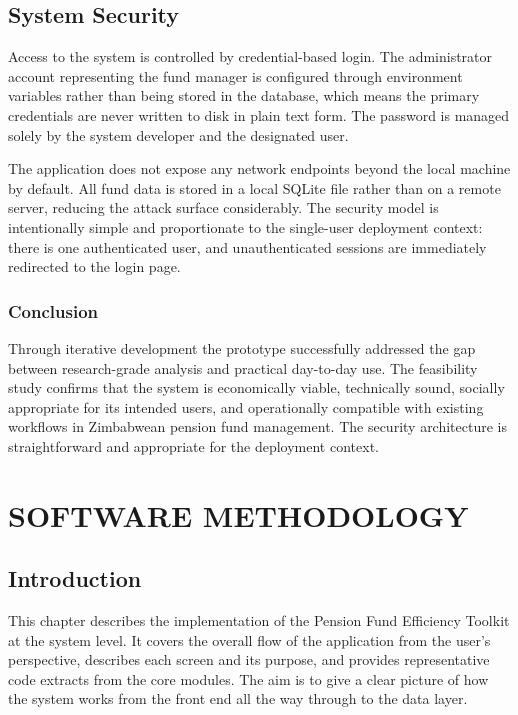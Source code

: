 \documentclass[12pt,a4paper]{report}
\begin{document}
\section{System Security}

Access to the system is controlled by credential-based login. The administrator account
representing the fund manager is configured through environment variables rather than
being stored in the database, which means the primary credentials are never written to disk
in plain text form. The password is managed solely by the system developer and the
designated user.

The application does not expose any network endpoints beyond the local machine by default.
All fund data is stored in a local SQLite file rather than on a remote server, reducing
the attack surface considerably. The security model is intentionally simple and
proportionate to the single-user deployment context: there is one authenticated user, and
unauthenticated sessions are immediately redirected to the login page.

\subsection*{Conclusion}

Through iterative development the prototype successfully addressed the gap between
research-grade analysis and practical day-to-day use. The feasibility study confirms that
the system is economically viable, technically sound, socially appropriate for its intended
users, and operationally compatible with existing workflows in Zimbabwean pension fund
management. The security architecture is straightforward and appropriate for the deployment
context.

\chapter{SOFTWARE METHODOLOGY}

\section{Introduction}

This chapter describes the implementation of the Pension Fund Efficiency Toolkit at the
system level. It covers the overall flow of the application from the user's perspective,
describes each screen and its purpose, and provides representative code extracts from the
core modules. The aim is to give a clear picture of how the system works from the front
end all the way through to the data layer.
\end{document}
